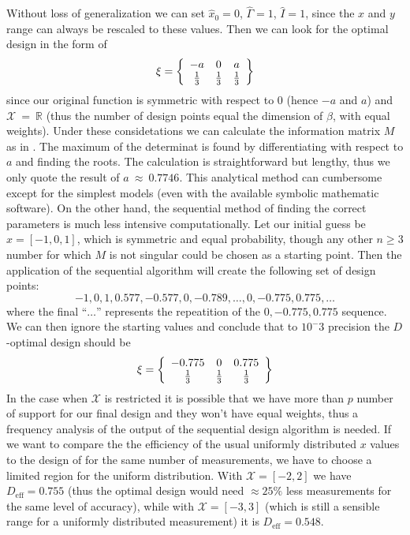 \documentclass[12pt]{iopart}
\begin{document}
Without loss of generalization we can set $\hat x_0 = 0$, $\hat \Gamma = 1$, $\hat I = 1$, since the $x$ and $y$ range can always be rescaled to these values. Then we can look for the optimal design in the form of
\begin{equation}
\xi = \left\{
  \begin{array}{c c c}
    -a & 0 & a\\
    \frac{1}{3} & \frac{1}{3} & \frac{1}{3}\\
  \end{array} \right \}
\end{equation}
since our original function is symmetric with respect to 0 (hence $-a$ and $a$) and $\mathcal{X}~=~\mathbb{R}$ (thus the number of design points equal the dimension of $\beta$, with equal weights). Under these considetations we can calculate the information matrix $M$ as in . The maximum of the determinat is found by differentiating with respect to $a$ and finding the roots. The calculation is straightforward but lengthy, thus we only quote the result of $a~\approx~0.7746$. This analytical method can cumbersome except for the simplest models (even with the available symbolic mathematic software). On the other hand, the sequential method of finding the correct parameters is much less intensive computationally. Let our initial guess be $x = [-1, 0, 1]$, which is symmetric and equal probability, though any other $n \geq 3$ number for which $M$ is not singular could be chosen as a starting point. Then the application of the sequential algorithm will create the following set of design points:
\begin{equation}
    -1, 0, 1, 0.577, -0.577, 0, -0.789,\ldots,0,-0.775,0.775,\ldots
\label{eq:l3seq}
\end{equation}
where the final ``$\ldots$'' represents the repeatition of the $0,-0.775,0.775$ sequence. We can then ignore the starting values and conclude that to $10^-3$ precision the $D$-optimal design should be
\begin{equation}
\xi = \left\{
  \begin{array}{c c c}
    -0.775 & 0 & 0.775\\
    \frac{1}{3} & \frac{1}{3} & \frac{1}{3}\\
  \end{array} \right \}
\label{eq:lorentzxi1}
\end{equation}
In the case when $\mathcal{X}$ is restricted it is possible that we have more than $p$ number of support for our final design and they won't have equal weights, thus a frequency analysis of the output of the sequential design algorithm is needed.
If we want to compare the the efficiency of the usual uniformly distributed $x$ values to the design of  for the same number of measurements, we have to choose a limited region for the uniform distribution. With $\mathcal{X} = [-2, 2]$ we have $D_\mathrm{eff} = 0.755$ (thus the optimal design would need $\approx 25\%$ less measurements for the same level of accuracy), while with $\mathcal{X} =[-3, 3]$ (which is still a sensible range for a uniformly distributed measurement) it is $D_\mathrm{eff} = 0.548$.
\end{document}
